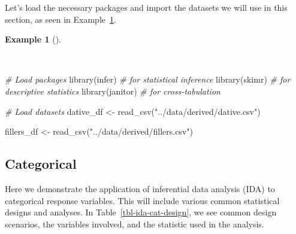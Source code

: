 \documentclass[
  letterpaper,
  DIV=11,
  numbers=noendperiod]{scrreprt}
\newenvironment{Shaded}{\begin{snugshade}}{\end{snugshade}}
\newcommand{\CommentTok}[1]{\textcolor[rgb]{0.00,0.00,0.00}{\textit{#1}}}
\newcommand{\FunctionTok}[1]{\textcolor[rgb]{0.00,0.00,0.00}{#1}}
\newcommand{\NormalTok}[1]{\textcolor[rgb]{0.00,0.00,0.00}{#1}}
\newcommand{\OtherTok}[1]{\textcolor[rgb]{0.00,0.00,0.00}{#1}}
\newcommand{\StringTok}[1]{\textcolor[rgb]{0.00,0.00,0.00}{#1}}
\theoremstyle{definition}
\newtheorem{example}{Example}[chapter]
\theoremstyle{remark}
\begin{document}
Let's load the necessary packages and import the datasets we will use in
this section, as seen in Example~\ref{exm-ida-setup}.

\begin{example}[]\protect\hypertarget{exm-ida-setup}{}\label{exm-ida-setup}

~

\begin{Shaded}
\begin{Highlighting}[]
\CommentTok{\# Load packages}
\FunctionTok{library}\NormalTok{(infer)      }\CommentTok{\# for statistical inference}
\FunctionTok{library}\NormalTok{(skimr)      }\CommentTok{\# for descriptive statistics}
\FunctionTok{library}\NormalTok{(janitor)    }\CommentTok{\# for cross{-}tabulation}

\CommentTok{\# Load datasets}
\NormalTok{dative\_df }\OtherTok{\textless{}{-}}
  \FunctionTok{read\_csv}\NormalTok{(}\StringTok{"../data/derived/dative.csv"}\NormalTok{)}

\NormalTok{fillers\_df }\OtherTok{\textless{}{-}}
  \FunctionTok{read\_csv}\NormalTok{(}\StringTok{"../data/derived/fillers.csv"}\NormalTok{)}
\end{Highlighting}
\end{Shaded}

\end{example}

\subsection{Categorical}\label{sec-ida-categorical}

Here we demonstrate the application of inferential data analysis (IDA)
to categorical response variables. This will include various common
statistical designs and analyses. In Table~\ref{tbl-ida-cat-design}, we
see common design scenarios, the variables involved, and the statistic
used in the analysis.
\end{document}
